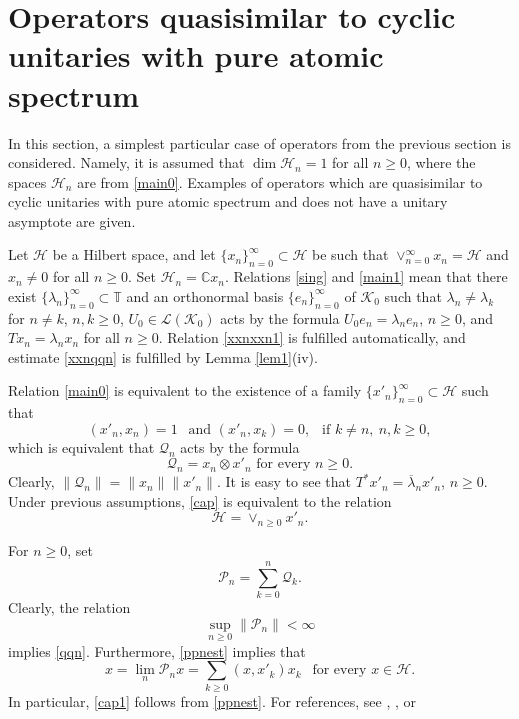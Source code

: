 \documentclass[a4paper,oneside,11pt]{amsart}
\numberwithin{equation}{section}
\theoremstyle{plain}
\theoremstyle{definition}
\begin{document}
\section{Operators quasisimilar to cyclic unitaries with pure atomic spectrum} 

In this section, a simplest particular case of operators from the previous section is considered.  Namely, it is assumed that   $\dim\mathcal H_n=1$ for all $n\geq 0$, where the  spaces  $\mathcal H_n$ are from \eqref{main0}. 
Examples of operators which are  quasisimilar to  cyclic unitaries with pure atomic spectrum and does not have a unitary asymptote are given. 

Let $\mathcal H$ be a Hilbert space, and let 
$\{x_n\}_{n=0}^\infty\subset\mathcal H$ be such that $\vee_{n=0}^\infty x_n=\mathcal H$ and
 $x_n\neq 0$ for all $n\geq 0$. Set $\mathcal H_n=\mathbb C x_n$. 
 Relations  \eqref{sing} and \eqref{main1} mean that there exist
$\{\lambda_n\}_{n=0}^\infty\subset\mathbb T$ and  an orthonormal basis $\{e_n\}_{n=0}^\infty$ of $ \mathcal K_0$ 
such that $\lambda_n\neq\lambda_k$ for $n\neq k$, $n,k\geq 0$, 
$U_0\in\mathcal L(\mathcal K_0)$ acts by the formula $U_0e_n=\lambda_ne_n$, $n\geq 0$,  and 
$Tx_n=\lambda_nx_n$ for all $n\geq 0 $. Relation \eqref{xxnxxn1} is fulfilled automatically, 
and estimate \eqref{xxnqqn} is fulfilled by Lemma \ref{lem1}(iv). 

Relation \eqref{main0} is equivalent to the existence of a family $\{x'_n\}_{n=0}^\infty\subset \mathcal H$ such that 
\begin{equation}\label{main01} (x'_n,x_n)=1 \ \ \text{ and } 
  (x'_n,x_k)=0, \ \ \text{ if }  k\neq n, \ n,k\geq 0,\end{equation} 
which is equivalent that $\mathcal Q_n$ acts by the formula 
 \begin{equation}\label{qqndef} \mathcal Q_n=x_n\otimes x'_n \text{ for every }n\geq 0.\end{equation} 
Clearly, $\|\mathcal Q_n\|=\|x_n\|\|x'_n\|$. 
It is easy to see that $T^*x'_n=\overline\lambda_nx'_n$, $n\geq 0$. 
Under previous assumptions,  \eqref{cap} is equivalent to the relation
\begin{equation}\label{cap1}\mathcal H=\vee_{n\geq 0}x'_n. \end{equation} 
 
For $n\geq 0$, set
\begin{equation}\label{ppndef} \mathcal P_n=\sum_{k=0}^n \mathcal Q_k. \end{equation}  
Clearly, the relation  \begin{equation}\label{ppnest}\sup_{n\geq 0}\|\mathcal P_n\|<\infty \end{equation}
implies \eqref{qqn}. Furthermore, \eqref{ppnest} implies that 
 $$x=\lim_n\mathcal P_nx=\sum_{k\geq 0}(x,x'_k)x_k \ \ \text{ for every } x\in\mathcal H.$$
In particular, \eqref{cap1} follows from  \eqref{ppnest}. 
For references, see 
{\cite[Ch. VI.1,VI.3]{nik86}}, {\cite[Ch. I.A.5.1,  II.C.3.1]{nik02}}, 
or {\cite[Theorems I.6.1, I.7.1, p. 53, 58, and Proposition II.II.14.1, p. 427]{singer}}
 
\end{document}
